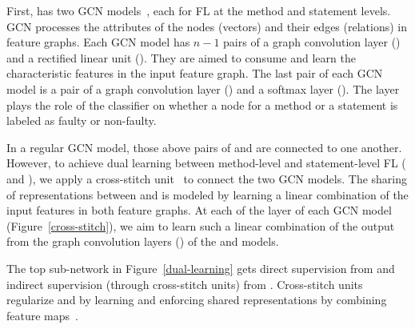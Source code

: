 
 First, {\tool}
has two GCN models~\cite{kipf2016semi}, each for FL at the method and
statement levels. GCN processes the attributes of the nodes (vectors)
and their edges (relations) in feature graphs. Each GCN model has
$n-1$ pairs of a graph convolution layer () and a rectified
linear unit (). They are aimed to consume and learn the
characteristic features in the input feature graph. The last pair of
each GCN model is a pair of a graph convolution layer ()
and a softmax layer (). The  layer plays
the role of the classifier on whether a node for a method or a
statement is labeled as faulty or non-faulty.

 In a regular GCN
model, those above pairs of  and  are connected
to one another. However, to achieve dual learning between method-level
and state\-ment-level FL ( and ), we apply a
cross-stitch unit~\cite{misra2016cross} to connect the two GCN
models. The sharing of representations between  and
 is modeled by learning a linear combination of the input
features in both feature graphs. At each of the  layer of
each GCN model (Figure~\ref{cross-stitch}), we aim to learn such a
linear combination of the output from the graph convolution layers
() of the  and  models.

The top sub-network in Figure~\ref{dual-learning} gets direct
supervision from  and indirect supervision (through
cross-stitch units) from . Cross-stitch units regularize
 and  by learning and enforcing shared
representations by combining feature maps~\cite{misra2016cross}.



